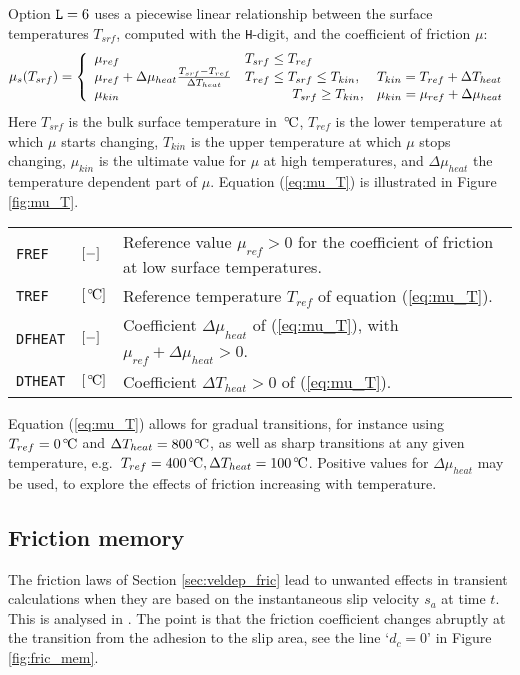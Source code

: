 \documentclass[12pt]{report}
\newcommand{\allexamp}[1]{}
\newenvironment{inputvars}{\vspace{0.4\baselineskip}%

\begin{tabular}{>{\raggedright}p{22mm}p{19mm}p{113mm}}}{
\end{tabular}

}
\newcommand{\inpvar}[3]{{\small\tt #1} & $#2$ & #3 \\[1ex]}
\begin{document}
Option ${\tt L}=6$ uses a piecewise linear relationship between the surface
temperatures $T_{srf}$, computed with the {\tt H}-digit, and the coefficient
of friction $\mu$:
\begin{equation}\label{eq:mu_T}
        \mu_s(T_{srf}) = \left\{ \begin{array}{lll}
                \mu_{ref} & T_{srf} \le T_{ref} \\
                \mu_{ref} + \Delta\mu_{heat}
                                \frac{T_{srf}-T_{ref}}{\Delta T_{heat}} 
                          & T_{ref} \le T_{srf} \le T_{kin}, &
                            T_{kin} = T_{ref} + \Delta T_{heat} \\
                \mu_{kin} & \hspace{12.5mm} T_{srf}\ge T_{kin},       &
                            \mu_{kin} = \mu_{ref} + \Delta\mu_{heat}
        \end{array} \right. 
\end{equation}
Here $T_{srf}$ is the bulk surface temperature in $\mbox{}\mbox{}^{\,\circ\!}\mathrm{C}$,
$T_{ref}$ is the lower temperature at which $\mu$ starts changing,
$T_{kin}$ is the upper temperature at which $\mu$ stops changing,
$\mu_{kin}$ is the ultimate value for $\mu$ at high temperatures, and
$\Delta\mu_{heat}$ the temperature dependent part of $\mu$. 
Equation (\ref{eq:mu_T}) is illustrated in Figure \ref{fig:mu_T}. 
\begin{inputvars}
\inpvar{FREF}{\bunit{-}}{Reference value $\mu_{ref}>0$ for the coefficient of
        friction at low surface temperatures.}
\inpvar{TREF}{\bunit{\celc}}{Reference temperature $T_{ref}$ of equation
        (\ref{eq:mu_T}).}
\inpvar{DFHEAT}{\bunit{-}}{Coefficient $\Delta\mu_{heat}$ of (\ref{eq:mu_T}),
        with $\mu_{ref}+\Delta\mu_{heat}>0$.}
\inpvar{DTHEAT}{\bunit{\celc}}{Coefficient $\Delta T_{heat}>0$ of (\ref{eq:mu_T}).}
\end{inputvars}
Equation (\ref{eq:mu_T}) allows
for gradual transitions, for instance using $T_{ref}=0\mbox{}^{\,\circ\!}\mathrm{C}$ and $\Delta
T_{heat}=800\mbox{}^{\,\circ\!}\mathrm{C}$, as well as sharp transitions at any given temperature,
e.g.\ $T_{ref}=400\mbox{}^{\,\circ\!}\mathrm{C}, \Delta T_{heat}=100\mbox{}^{\,\circ\!}\mathrm{C}$. Positive values for
$\Delta\mu_{heat}$ may be used, to explore the effects of friction
increasing with temperature.

\subsection{Friction memory}

The friction laws of Section \ref{sec:veldep_fric} lead to
unwanted effects in transient calculations when they are based on the
instantaneous slip velocity $s_a$ at time $t$. This is \allexamp{illustrated
in the example in Section \ref{sec:ex_veldep} and} analysed
\allexamp{further} in \cite{Vollebregt2012a-quasistd}. The point is that the
friction coefficient changes abruptly at the transition from the adhesion
to the slip area, see the line `$d_c=0$' in Figure \ref{fig:fric_mem}. 
\end{document}
